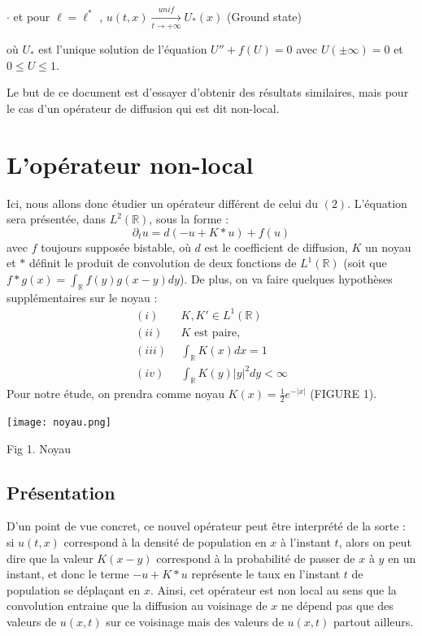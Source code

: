 \documentclass{article}
\begin{document}
$\cdot$ et pour $\ell = \ell^* $ , $u(t,x) \underset{t \to +\infty}{\overset{unif}{\longrightarrow}}U_{*}(x)$ (Ground state)

\noindent où $U_*$ est l'unique solution de l'équation $U'' + f(U) = 0$ avec $U(\pm \infty) = 0$ et $ 0 \le U \le 1 $. \newline 

Le but de ce document est d'essayer d'obtenir des résultats similaires, mais pour le cas d'un opérateur de diffusion qui est dit non-local.

\section{L'opérateur non-local}

\indent Ici, nous allons donc étudier un opérateur différent de celui du $(2)$. L'équation sera présentée, dans $L^2(\mathbb{R})$, sous la forme : 
\begin{equation}
\partial_t u =  d(-u + K*u)+f(u)
\end{equation}
avec $f$ toujours supposée bistable, où $d$ est le coefficient de diffusion, $K$ un noyau et $*$ définit le produit de convolution de deux fonctions de $L^1(\mathbb{R})$ (soit que $f*g(x) = \int_{\mathbb{R}}f(y)g(x-y)dy$). De plus, on va faire quelques hypothèses supplémentaires sur le noyau :
\begin{equation}
\begin{split}
(i)~~ &K, K' \in L^1(\mathbb{R}) \\
(ii)~~ & K \text{ est paire, } \\
(iii) ~~& \int_\mathbb{R} K(x)dx = 1 \\
(iv) ~~& \int_\mathbb{R} K(y)|y|^2dy < \infty
\end{split}
\end{equation}
Pour notre étude, on prendra comme noyau $K(x) = \frac{1}{2} e^{-|x|} $ (FIGURE 1).

\begin{center}
\texttt{[image: noyau.png]}

Fig 1. Noyau
\end{center}

\subsection{Présentation}
\indent D'un point de vue concret, ce nouvel opérateur peut être interprété de la sorte : si $u(t,x)$ correspond à la densité de population en $x$ à l'instant $t$, alors on peut dire que la valeur $K(x-y)$ correspond à la probabilité de passer de $x$ à $y$ en un instant, et donc le terme $-u + K*u$  représente le taux en l'instant $t$ de population se déplaçant en $x$. Ainsi, cet opérateur est non local au sens que la convolution entraine que la diffusion au voisinage de $x$ ne dépend pas que des valeurs de $u(x,t)$ sur ce voisinage mais des valeurs de $u(x,t)$ partout ailleurs. 
\end{document}
